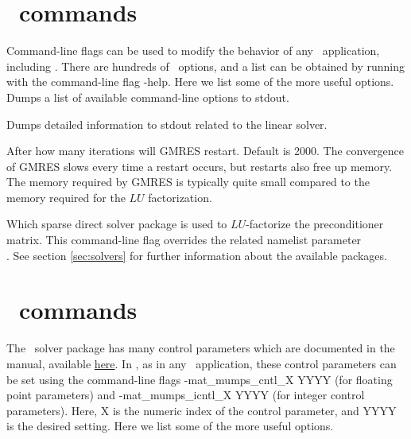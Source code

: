 \section{\PETSc~commands}

Command-line flags can be used to modify the behavior of any \PETSc~application, including \sfincs.
There are hundreds of \PETSc~options, and a list can be obtained by running with the command-line flag
{\ttfamily -help}. Here we list some of the more useful options.\\

{Dumps a list of available command-line options to stdout.}

\myhrule

{Dumps detailed information to stdout related to the linear solver.}

\myhrule

{After how many iterations will GMRES restart. Default is 2000. The convergence of GMRES slows every time a restart occurs, but restarts also free up memory.
The memory required by GMRES is typically quite small compared to the memory required for the $LU$ factorization.}

\myhrule

{Which sparse direct solver package is used to $LU$-factorize the preconditioner matrix.
This command-line flag overrides the related namelist parameter\\
.
See section \ref{sec:solvers} for further information about the available packages.
}

\section{\mumps~commands}
\label{sec:mumpsControlParameters}

The \mumps~solver package has many control parameters which are documented in the manual,
available \href{http://mumps-solver.org/}{here}.
In \sfincs, as in any \PETSc~application, these control parameters can be set
using the command-line flags {\ttfamily -mat\_mumps\_cntl\_X YYYY} (for floating point parameters)
and {\ttfamily -mat\_mumps\_icntl\_X YYYY} (for integer control parameters). 
Here, {\ttfamily X} is the numeric index of the control parameter,
and {\ttfamily YYYY} is the desired setting.
Here we list some of the more useful options.\\

